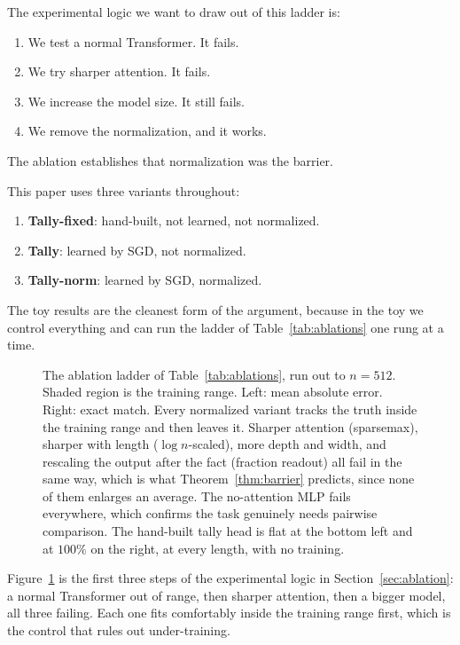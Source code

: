 \documentclass[10pt]{article}
\theoremstyle{definition}
\begin{document}
The experimental logic we want to draw out of this ladder is:
\begin{enumerate}
\item We test a normal Transformer. It fails.
\item We try sharper attention. It fails.
\item We increase the model size. It still fails.
\item We remove the normalization, and it works.
\end{enumerate}
The ablation establishes that normalization was the barrier.


This paper uses three variants throughout:
\begin{enumerate}
\item \textbf{Tally-fixed}: hand-built, not learned, not normalized.
\item \textbf{Tally}: learned by SGD, not normalized.
\item \textbf{Tally-norm}: learned by SGD, normalized.
\end{enumerate}

\label{sec:toy-results}

The toy results are the cleanest form of the argument, because in the toy
we control everything and can run the ladder of
Table~\ref{tab:ablations} one rung at a time.

\begin{figure}[htbp]
\centering

\caption{The ablation ladder of Table~\ref{tab:ablations}, run out to
$n=512$. Shaded region is the training range. Left: mean absolute error.
Right: exact match. Every normalized variant tracks the truth inside the
training range and then leaves it. Sharper attention (sparsemax), sharper
with length ($\log n$-scaled), more depth and width, and rescaling the
output after the fact (fraction readout) all fail in the same way, which
is what Theorem~\ref{thm:barrier} predicts, since none of them enlarges an
average. The no-attention MLP fails everywhere, which confirms the task
genuinely needs pairwise comparison. The hand-built tally head is flat at
the bottom left and at $100\%$ on the right, at every length, with no
training.}
\label{fig:collapse}
\end{figure}

Figure~\ref{fig:collapse} is the first three steps of the experimental
logic in Section~\ref{sec:ablation}: a normal Transformer out of range,
then sharper attention, then a bigger model, all three failing. Each one
fits comfortably inside the training range first, which is the control that
rules out under-training.
\end{document}
